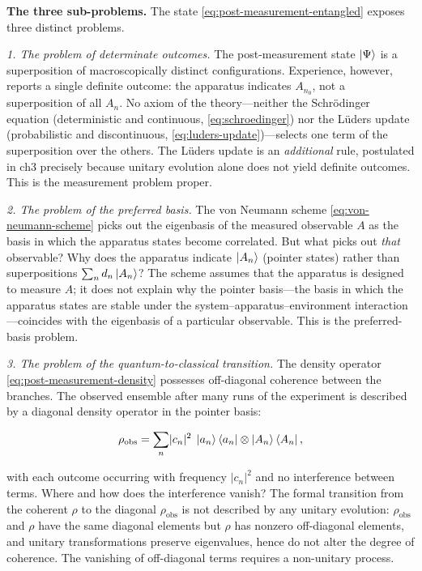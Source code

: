 \medskip\noindent\textbf{The three sub-problems.}
The state \eqref{eq:post-measurement-entangled} exposes three distinct problems.

\textit{1. The problem of determinate outcomes.}
The post-measurement state $\ket{\Psi}$ is a superposition of macroscopically distinct configurations. Experience, however, reports a single definite outcome: the apparatus indicates $A_{n_0}$, not a superposition of all $A_n$. No axiom of the theory---neither the Schr\"odinger equation (deterministic and continuous, \eqref{eq:schroedinger}) nor the L\"uders update (probabilistic and discontinuous, \eqref{eq:luders-update})---selects one term of the superposition over the others. The L\"uders update is an \textit{additional} rule, postulated in ch3 precisely because unitary evolution alone does not yield definite outcomes. This is the measurement problem proper.

\textit{2. The problem of the preferred basis.}
The von Neumann scheme \eqref{eq:von-neumann-scheme} picks out the eigenbasis of the measured observable $A$ as the basis in which the apparatus states become correlated. But what picks out \textit{that} observable? Why does the apparatus indicate $\ket{A_n}$ (pointer states) rather than superpositions $\sum_n d_n \ket{A_n}$? The scheme assumes that the apparatus is designed to measure $A$; it does not explain why the pointer basis---the basis in which the apparatus states are stable under the system--apparatus--environment interaction---coincides with the eigenbasis of a particular observable. This is the preferred-basis problem.

\textit{3. The problem of the quantum-to-classical transition.}
The density operator \eqref{eq:post-measurement-density} possesses off-diagonal coherence between the branches. The observed ensemble after many runs of the experiment is described by a diagonal density operator in the pointer basis:
\begin{linenomath}
\begin{equation}
\rho_{\text{obs}} = \sum_n \lvert c_n\rvert^2\; \ket{a_n}\bra{a_n} \otimes \ket{A_n}\bra{A_n},
\end{equation}
\end{linenomath}
with each outcome occurring with frequency $\lvert c_n\rvert^2$ and no interference between terms. Where and how does the interference vanish? The formal transition from the coherent $\rho$ to the diagonal $\rho_{\text{obs}}$ is not described by any unitary evolution: $\rho_{\text{obs}}$ and $\rho$ have the same diagonal elements but $\rho$ has nonzero off-diagonal elements, and unitary transformations preserve eigenvalues, hence do not alter the degree of coherence. The vanishing of off-diagonal terms requires a non-unitary process.

